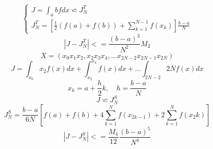 \begin{dmath}
	\begin{cases}
		J = \int_{a}{b}fdx \backsimeq J^T_N \\ 
		J^T_N = [\frac{1}{2}(f(a)+f(b)) + \sum_{k=1}^{N-1}f(x_k)]\frac{b-a}{N}
	\end{cases}
\end{dmath}
\begin{equation}
	|J-J^T_N| <= \frac{(b-a)^3}{N^2}M_2
\end{equation}
\begin{equation}
	X = (x_0 x_1 x_2, x_2 x_3 x_4, \dots x_{2N-2}x_{2N-1}x_{2N})
\end{equation}
\begin{equation}
	J=\int_{x_0}{x_2}f(x)dx + \int_{x_2}^{x_4}f(x)dx + \dots \int_{2N-2}{2N}f(x)dx
\end{equation}
\begin{equation}
	x_k = a + \frac{h}{2}k, \quad h=\frac{b-a}{N}
\end{equation}
\begin{equation}
	J \backsimeq J_N^S
\end{equation}
\begin{equation}
	J_N^S = \frac{b-a}{6N}[f(a) + f(b) + 4\sum_{k=1}^{N}f(x_{2k-1}) + 2\sum_{k=1}^{N}f(x_2k)]
\end{equation}
\begin{equation}
	|J-J^S_N| <= \frac{M_4}{12}\frac{(b-a)^5}{N^4}
\end{equation}